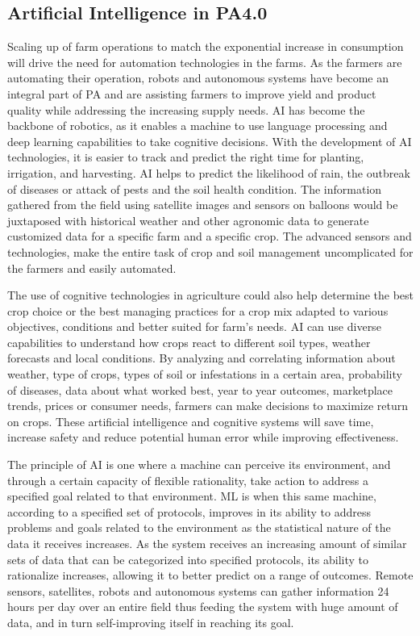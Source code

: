 \documentclass[review]{elsarticle}
\begin{document}
\subsection{Artificial Intelligence in PA4.0}

    Scaling up of farm operations to match the exponential increase in consumption will drive the need for automation technologies in the farms. As the farmers are automating their operation, robots and autonomous systems have become an integral part of PA and are assisting farmers to improve yield and product quality while addressing the increasing supply needs. AI has become the backbone of robotics, as it enables a machine to use language processing and deep learning capabilities to take cognitive decisions. With the development of AI technologies, it is easier to track and predict the right time for planting, irrigation, and harvesting. AI helps to predict the likelihood of rain, the outbreak of diseases or attack of pests and the soil health condition. The information gathered from the field using satellite images and sensors on balloons would be juxtaposed with historical weather and other agronomic data to generate customized data for a specific farm and a specific crop. The advanced sensors and technologies, make the entire task of crop and soil management uncomplicated for the farmers and easily automated. 

    The use of cognitive technologies in agriculture could also help determine the best crop choice or the best managing practices for a crop mix adapted to various objectives, conditions and better suited for farm’s needs. AI can use diverse capabilities to understand how crops react to different soil types, weather forecasts and local conditions. By analyzing and correlating information about weather, type of crops, types of soil or infestations in a certain area, probability of diseases, data about what worked best, year to year outcomes, marketplace trends, prices or consumer needs, farmers can make decisions to maximize return on crops. These artificial intelligence and cognitive systems will save time, increase safety and reduce potential human error while improving effectiveness.

    The principle of AI is one where a machine can perceive its environment, and through a certain capacity of flexible rationality, take action to address a specified goal related to that environment. ML is when this same machine, according to a specified set of protocols, improves in its ability to address problems and goals related to the environment as the statistical nature of the data it receives increases. As the system receives an increasing amount of similar sets of data that can be categorized into specified protocols, its ability to rationalize increases, allowing it to better predict on a range of outcomes. Remote sensors, satellites, robots and autonomous systems can gather information 24 hours per day over an entire field thus feeding the system with huge amount of data, and in turn self-improving itself in reaching its goal.
\end{document}
